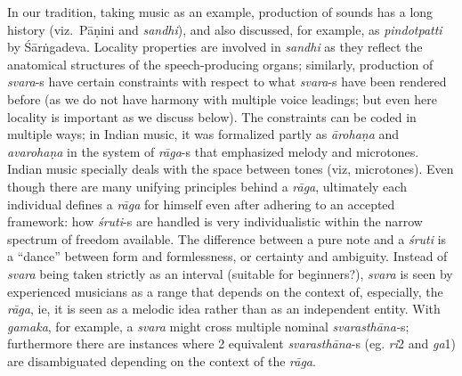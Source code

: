 In our tradition, taking music as an example, production of sounds has a long history (viz.~Pāṇini and \textsl{sandhi}), and also discussed, for example, as \textsl{pindotpatti} by Śārṅgadeva. Locality properties are involved in \textsl{sandhi} as they reflect the anatomical structures of the speech-producing organs; similarly, production of \textsl{svara}-s have certain constraints with respect to what \textsl{svara}-s have been rendered before (as we do not have harmony with multiple voice leadings; but even here locality is important as we discuss below). The constraints can be coded in multiple ways; in Indian music, it was formalized partly as \textsl{ārohaṇa} and \textsl{avarohaṇa} in the system of \textsl{rāga}-s that emphasized melody and microtones. Indian music specially deals with the space between tones (viz, microtones). Even though there are many unifying principles behind a \textsl{rāga}, ultimately each individual defines a \textsl{rāga} for himself even after adhering to an accepted framework: how \textsl{śruti}-s are handled is very individualistic within the narrow spectrum of freedom available. The difference between a pure note and a \textsl{śruti} is a “dance” between form and formlessness, or certainty and ambiguity. Instead of \textsl{svara} being taken strictly as an interval (suitable for beginners?), \textsl{svara} is seen by experienced musicians as a range that depends on the context of, especially, the \textsl{rāga}, ie, it is seen as a melodic idea rather than as an independent entity. With \textsl{gamaka}, for example, a \textsl{svara} might cross multiple nominal \textsl{svarasthāna-}s; furthermore there are instances where 2 equivalent \textsl{svarasthāna}-s (eg. \textsl{ri}2 and \textsl{ga}1) are disambiguated depending on the context of the \textsl{rāga}.


